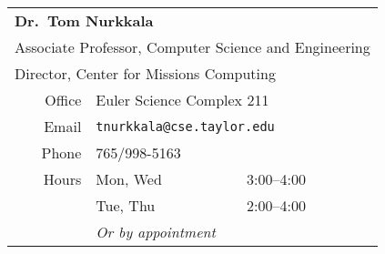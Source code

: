 \begin{center}
  \begin{tabular}{rll}
    \toprule
    \multicolumn{3}{l}{\textbf{Dr.\ Tom Nurkkala}}                            \\
    \multicolumn{3}{l}{Associate Professor, Computer Science and Engineering} \\
    \multicolumn{3}{l}{Director, Center for Missions Computing}               \\
    \midrule
    Office & \multicolumn{2}{l}{Euler Science Complex 211}                    \\
    Email  & \multicolumn{2}{l}{\texttt{tnurkkala@cse.taylor.edu}}            \\
    Phone  & \multicolumn{2}{l}{765/998-5163}                                 \\
    Hours  & Mon, Wed & 3:00--4:00                                            \\
           & Tue, Thu & 2:00--4:00                                            \\
           & \multicolumn{2}{l}{\emph{Or by appointment}}                     \\
    \bottomrule
  \end{tabular}
\end{center}


